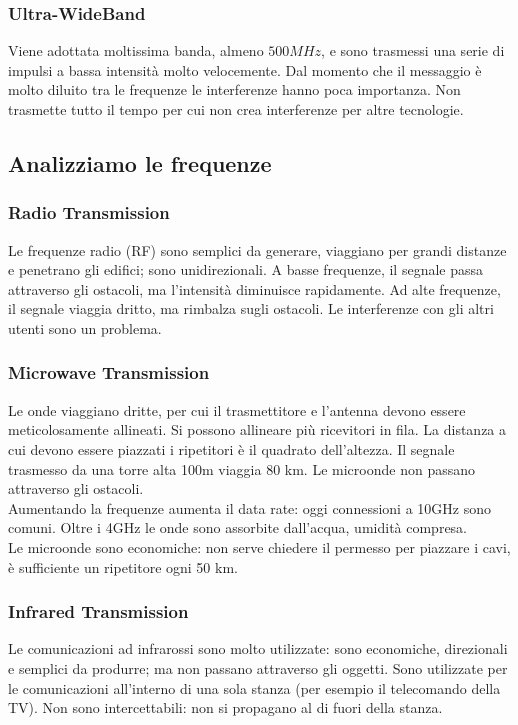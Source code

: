 \documentclass{article}
\begin{document}
\subsubsection{Ultra-WideBand}
Viene adottata moltissima banda, almeno $500MHz$, e sono trasmessi una serie di
impulsi a bassa intensità molto velocemente. Dal momento che il messaggio è
molto diluito tra le frequenze le interferenze hanno poca importanza. Non
trasmette tutto il tempo per cui non crea interferenze per altre tecnologie.

\subsection{Analizziamo le frequenze}

\subsubsection{Radio Transmission}
Le frequenze radio (RF) sono semplici da generare, viaggiano per grandi distanze
e penetrano gli edifici; sono unidirezionali. A basse frequenze, il segnale
passa attraverso gli ostacoli, ma l'intensità diminuisce rapidamente. Ad alte
frequenze, il segnale viaggia dritto, ma rimbalza sugli ostacoli. Le
interferenze con gli altri utenti sono un problema.

\subsubsection{Microwave Transmission}
Le onde viaggiano dritte, per cui il trasmettitore e l'antenna devono essere
meticolosamente allineati. Si possono allineare più ricevitori in fila. La
distanza a cui devono essere piazzati i ripetitori è il quadrato dell'altezza.
Il segnale trasmesso da una torre alta 100m viaggia 80 km. Le microonde non
passano attraverso gli ostacoli.\\
Aumentando la frequenze aumenta il data rate: oggi connessioni a 10GHz sono
comuni. Oltre i 4GHz le onde sono assorbite dall'acqua, umidità compresa.\\
Le microonde sono economiche: non serve chiedere il permesso per piazzare i
cavi, è sufficiente un ripetitore ogni 50 km.

\subsubsection{Infrared Transmission}
Le comunicazioni ad infrarossi sono molto utilizzate: sono economiche,
direzionali e semplici da produrre; ma non passano attraverso gli oggetti. Sono
utilizzate per le comunicazioni all'interno di una sola stanza (per esempio il
telecomando della TV). Non sono intercettabili: non si propagano al di fuori
della stanza.
\end{document}
